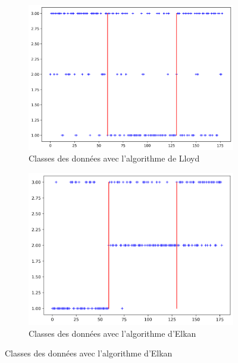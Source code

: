 \documentclass[a4paper,12pt]{article}
\begin{document}
\begin{figure}[h!] %
  \centering
  \begin{subfigure}[b]{0.48\textwidth}
    \includegraphics[width=\textwidth]{lloyd.png} %
    \caption{Classes des données avec l'algorithme de Lloyd}
    \label{fig:lloyd} %
  \end{subfigure}
  \hfill
  \begin{subfigure}[b]{0.48\textwidth}
    \includegraphics[width=\textwidth]{elkan.png} %
    \caption{Classes des données avec l'algorithme d'Elkan}
    \label{fig:elkan} %
  \end{subfigure}
  \label{fig:deux_images}
\end{figure}
\end{document}
